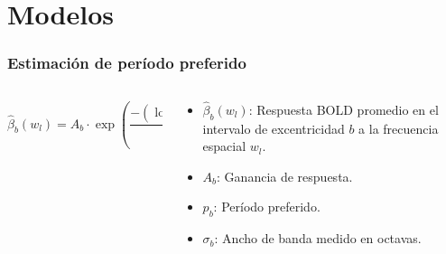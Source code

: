 \documentclass[
11pt, %
%
aspectratio=169, %
]{beamer}
\begin{document}
	\section{Modelos}
	\begin{frame}
		\frametitle{Estimaci\'on de per\'iodo preferido}
		
			\begin{columns}[t] %
			\begin{column}{0.5\textwidth} %
				\centering
				\begin{equation}
					\hat{\beta}_b(w_l) = A_b \cdot \exp\left(\frac{-(\log_2(w_l) + \log_2(p_b))^2}{2\sigma_b^2}\right)
				\end{equation}	
				
				
			\end{column}
			\begin{column}{0.5\textwidth} %
				\centering
				\begin{itemize} 			
					\item \(\hat{\beta}_b(w_l)\): Respuesta BOLD promedio en el intervalo de excentricidad \(b\) a la frecuencia espacial \(w_l\).		
					\item \(A_b\): Ganancia de respuesta.
					\item \(p_b\): Per\'iodo preferido.
					\item \(\sigma_b\): Ancho de banda medido en octavas.
				\end{itemize}	
				
				
			\end{column}
		\end{columns}
		
		
	
	\end{frame}
\end{document}
